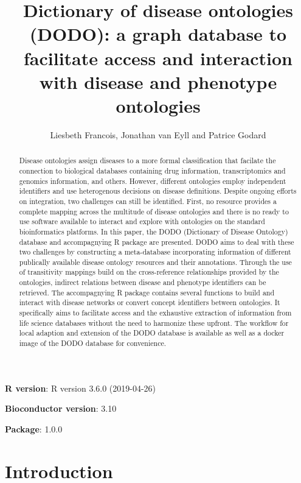 \documentclass[9pt,a4paper,]{extarticle}
\title{Dictionary of disease ontologies (DODO): a graph database to facilitate access and interaction with disease and phenotype ontologies}
\author{Liesbeth Francois, Jonathan van Eyll and Patrice Godard}
\date{}
\begin{document}
\maketitle
\begin{abstract}
Disease ontologies assign diseases to a more formal classification that facilate the connection to biological databases containing drug information, transcriptomics and genomics information, and others. However, different ontologies employ independent identifiers and use heterogenous decisions on disease definitions. Despite ongoing efforts on integration, two challenges can still be identified. First, no resource provides a complete mapping across the multitude of disease ontologies and there is no ready to use software available to interact and explore with ontologies on the standard bioinformatics platforms. In this paper, the DODO (Dictionary of Disease Ontology) database and accompagnying R package are presented. DODO aims to deal with these two challenges by constructing a meta-database incorporating information of different publically available disease ontology resources and their annotations. Through the use of transitivity mappings build on the cross-reference relationships provided by the ontologies, indirect relations between disease and phenotype identifiers can be retrieved. The accompagnying R package contains several functions to build and interact with disease networks or convert concept identifiers between ontologies. It specifically aims to facilitate access and the exhaustive extraction of information from life science databases without the need to harmonize these upfront. The workflow for local adaption and extension of the DODO database is available as well as a docker image of the DODO database for convenience.
\end{abstract}

\textbf{R version}: R version 3.6.0 (2019-04-26)

\textbf{Bioconductor version}: 3.10

\textbf{Package}: 1.0.0

\hypertarget{introduction}{%
\section{Introduction}\label{introduction}}
\end{document}
